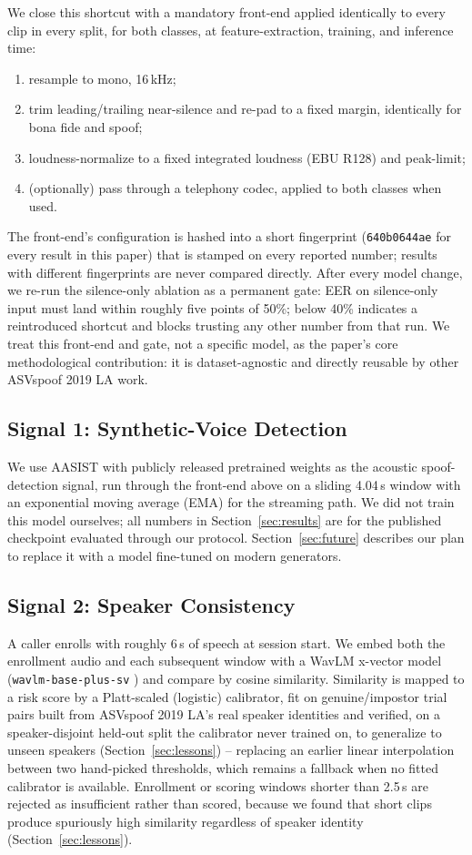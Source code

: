 \documentclass[conference]{IEEEtran}
\begin{document}
We close this shortcut with a mandatory front-end applied identically
to every clip in every split, for both classes, at feature-extraction,
training, and inference time:
\begin{enumerate}
\item resample to mono, 16\,kHz;
\item trim leading/trailing near-silence and re-pad to a fixed margin,
identically for bona fide and spoof;
\item loudness-normalize to a fixed integrated loudness (EBU R128) and
peak-limit;
\item (optionally) pass through a telephony codec, applied to both
classes when used.
\end{enumerate}
The front-end's configuration is hashed into a short fingerprint
(\texttt{640b0644ae} for every result in this paper) that is stamped on
every reported number; results with different fingerprints are never
compared directly. After every model change, we re-run the silence-only
ablation as a permanent gate: EER on silence-only input must land within
roughly five points of 50\%; below 40\% indicates a reintroduced
shortcut and blocks trusting any other number from that run. We treat
this front-end and gate, not a specific model, as the paper's core
methodological contribution: it is dataset-agnostic and directly reusable by
other ASVspoof 2019 LA work.

\subsection{Signal 1: Synthetic-Voice Detection}
We use AASIST \cite{aasist} with publicly released pretrained weights as
the acoustic spoof-detection signal, run through the front-end above on
a sliding 4.04\,s window with an exponential moving average (EMA) for
the streaming path. We did not train this model ourselves; all numbers
in Section~\ref{sec:results} are for the published checkpoint evaluated
through our protocol. Section~\ref{sec:future} describes our plan to
replace it with a model fine-tuned on modern generators.

\subsection{Signal 2: Speaker Consistency}
A caller enrolls with roughly 6\,s of speech at session start. We embed
both the enrollment audio and each subsequent window with a WavLM
x-vector model (\texttt{wavlm-base-plus-sv} \cite{wavlm}) and compare by
cosine similarity. Similarity is mapped to a risk score by a Platt-scaled
(logistic) calibrator, fit on genuine/impostor trial pairs built from
ASVspoof 2019 LA's real speaker identities and verified, on a
speaker-disjoint held-out split the calibrator never trained on, to
generalize to unseen speakers (Section~\ref{sec:lessons}) -- replacing an
earlier linear interpolation between two hand-picked thresholds, which
remains a fallback when no fitted calibrator is available. Enrollment or
scoring windows shorter than 2.5\,s are rejected as insufficient rather
than scored, because we found that short clips produce spuriously high
similarity regardless of speaker identity (Section~\ref{sec:lessons}).
\end{document}
